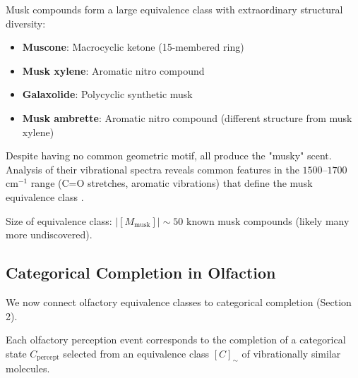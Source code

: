 \begin{example}
\label{ex:musk_equivalence}
Musk compounds form a large equivalence class with extraordinary structural diversity:

\begin{itemize}
\item \textbf{Muscone}: Macrocyclic ketone (15-membered ring)
\item \textbf{Musk xylene}: Aromatic nitro compound
\item \textbf{Galaxolide}: Polycyclic synthetic musk
\item \textbf{Musk ambrette}: Aromatic nitro compound (different structure from musk xylene)
\end{itemize}

Despite having no common geometric motif, all produce the "musky" scent. Analysis of their vibrational spectra reveals common features in the $1500$--$1700$ cm$^{-1}$ range (C=O stretches, aromatic vibrations) that define the musk equivalence class \cite{turin2002mechanism}.

Size of equivalence class: $|[M_{\text{musk}}]| \sim 50$ known musk compounds (likely many more undiscovered).
\end{example}

\subsection{Categorical Completion in Olfaction}

We now connect olfactory equivalence classes to categorical completion (Section 2).

\begin{theorem}
\label{thm:olfactory_categorical}
Each olfactory perception event corresponds to the completion of a categorical state $C_{\text{percept}}$ selected from an equivalence class $[C]_{\sim}$ of vibrationally similar molecules.
\end{theorem}

